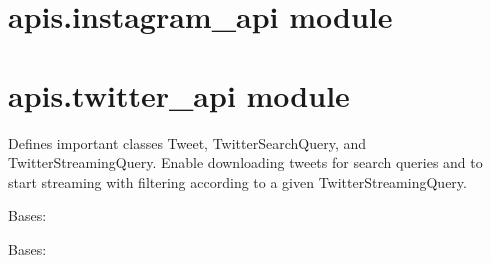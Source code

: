 \documentclass[letterpaper,10pt,english]{sphinxmanual}
\begin{document}
\section{apis.instagram\_api module}
\label{apis:apis-instagram-api-module}\label{apis:module-apis.instagram_api}

\section{apis.twitter\_api module}
\label{apis:module-apis.twitter_api}\label{apis:apis-twitter-api-module}
Defines important classes Tweet, TwitterSearchQuery, and TwitterStreamingQuery. Enable downloading tweets for search queries and to start streaming with filtering according to a given TwitterStreamingQuery.

\begin{fulllineitems}
\label{apis:apis.twitter_api.PrintingListener}
Bases: {\hyperref[apis:apis.twitter_api.TwitterStreamListener]{\emph{}}}

\begin{fulllineitems}
\label{apis:apis.twitter_api.PrintingListener.on_status}
\end{fulllineitems}


\end{fulllineitems}


\begin{fulllineitems}
\label{apis:apis.twitter_api.StoringListener}
Bases: {\hyperref[apis:apis.twitter_api.TwitterStreamListener]{\emph{}}}

\begin{fulllineitems}
\label{apis:apis.twitter_api.StoringListener.on_connect}
\end{fulllineitems}


\begin{fulllineitems}
\label{apis:apis.twitter_api.StoringListener.on_status}
\end{fulllineitems}


\end{fulllineitems}
\end{document}
